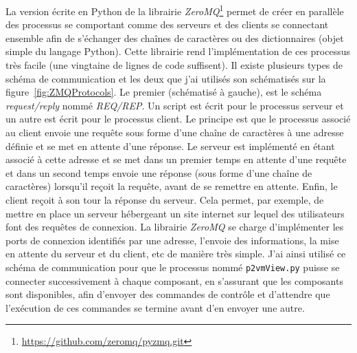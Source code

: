 La version écrite en Python de la librairie \textit{ZeroMQ}\footnote{\url{https://github.com/zeromq/pyzmq.git}} permet de créer en parallèle des processus se comportant comme des serveurs et des clients se connectant ensemble afin de s'échanger des chaînes de caractères ou des dictionnaires (objet simple du langage Python). Cette librairie rend l'implémentation de ces processus très facile (une vingtaine de lignes de code suffisent). Il existe plusieurs types de schéma de communication et les deux que j'ai utilisés son schématisés sur la figure~\ref{fig:ZMQProtocols}. Le premier (schématisé à gauche), est le schéma \textit{request/reply} nommé \textit{REQ/REP}. Un script est écrit pour le processus serveur et un autre est écrit pour le processus client. Le principe est que le processus associé au client envoie une requête sous forme d'une chaîne de caractères à une adresse définie et se met en attente d'une réponse. Le serveur est implémenté en étant associé à cette adresse et se met dans un premier temps en attente d'une requête et dans un second temps envoie une réponse (sous forme d'une chaîne de caractères) lorsqu'il reçoit la requête, avant de se remettre en attente. Enfin, le client reçoit à son tour la réponse du serveur. Cela permet, par exemple, de mettre en place un serveur hébergeant un site internet sur lequel des utilisateurs font des requêtes de connexion. La librairie \textit{ZeroMQ} se charge d'implémenter les ports de connexion identifiés par une adresse, l'envoie des informations, la mise en attente du serveur et du client, etc de manière très simple. J'ai ainsi utilisé ce schéma de communication pour que le processus nommé \texttt{p2vmView.py} puisse se connecter successivement à chaque composant, en s'assurant que les composants sont disponibles, afin d'envoyer des commandes de contrôle et d'attendre que l'exécution de ces commandes se termine avant d'en envoyer une autre.

